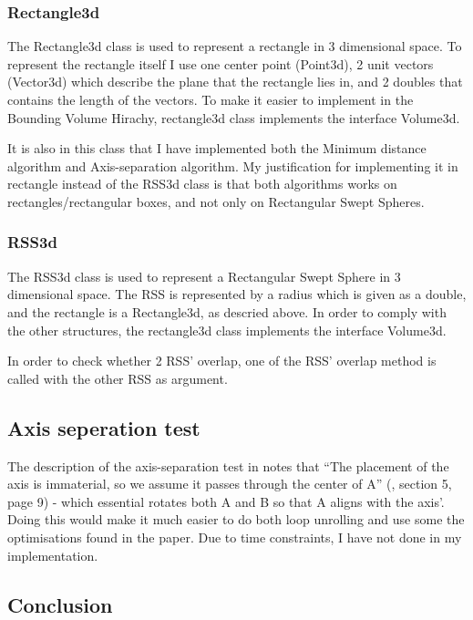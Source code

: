 \subsubsection{Rectangle3d}
\label{rectangle3d}
The Rectangle3d class is used to represent a rectangle in 3 dimensional space. To represent the rectangle itself I use one center point (Point3d), 2 unit vectors (Vector3d) which describe the plane that the rectangle lies in, and 2 doubles that contains the length of the vectors. To make it easier to implement in the Bounding Volume Hirachy, rectangle3d class implements the interface Volume3d.

It is also in this class that I have implemented both the Minimum distance algorithm and Axis-separation algorithm. My justification for implementing it in rectangle instead of the RSS3d class is that both algorithms works on rectangles/rectangular boxes, and not only on Rectangular Swept Spheres.

\subsubsection{RSS3d}
\label{RSS3d}
The RSS3d class is used to represent a Rectangular Swept Sphere in 3 dimensional space. The RSS is represented by a radius which is given as a double, and the rectangle is a Rectangle3d, as descried above. In order to comply with the other structures, the rectangle3d class implements the interface Volume3d.

In order to check whether 2 RSS' overlap, one of the RSS' overlap method is called with the other RSS as argument. 

\subsection{Axis seperation test}
\label{implementation_axis_sep}
The description of the axis-separation test in \cite{237244} notes that ``The placement of the axis is immaterial, so we assume it passes through the center of A'' (\cite{237244}, section 5, page 9) - which essential rotates both A and B so that A aligns with the axis'. Doing this would make it much easier to do both loop unrolling and use some the optimisations found in the paper. Due to time constraints, I have not done in my implementation.

\subsection{Conclusion}
